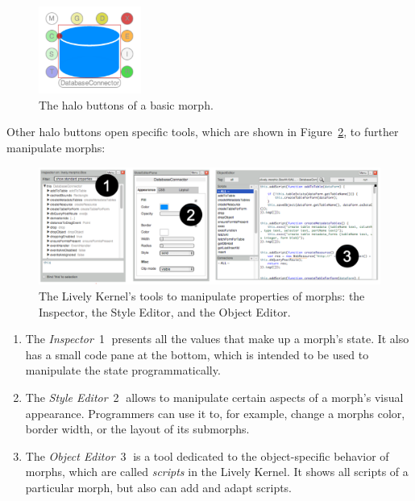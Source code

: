 \begin{figure}[h]
    \centering
    \includegraphics[width=0.3\textwidth]{figures/2_background/1_halos.pdf}
    \caption{The halo buttons of a basic morph.}
    \label{fig:Halos}
\end{figure}

Other halo buttons open specific tools, which are shown in Figure~\ref{fig:LivelyTools}, to further manipulate morphs:

\begin{figure}[h]
    \centering
    \includegraphics[width=\textwidth]{figures/2_background/2_LivelyTools.pdf}
    \caption{The Lively Kernel's tools to manipulate properties of morphs: the Inspector, the Style Editor, and the Object Editor.}
    \label{fig:LivelyTools}
\end{figure}

\begin{enumerate}
    \item The \emph{Inspector}~\textcircled{1} presents all the values that make up a morph's state. It also has a small code pane at the bottom, which is intended to be used to manipulate the state programmatically.
    \item The \emph{Style Editor}~\textcircled{2} allows to manipulate certain aspects of a morph's visual appearance. Programmers can use it to, for example, change a morphs color, border width, or the layout of its submorphs.
    \item The \emph{Object Editor}~\textcircled{3} is a tool dedicated to the object-specific behavior of morphs, which are called \emph{scripts} in the Lively Kernel. It shows all scripts of a particular morph, but also can add and adapt scripts.
\end{enumerate}


